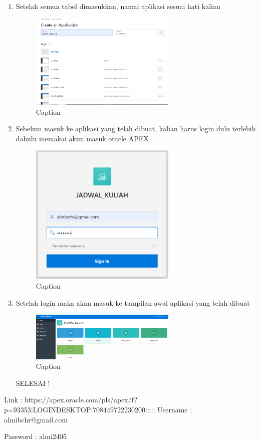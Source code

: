 \documentclass{article}
\begin{document}
\begin{enumerate}
    \item Setelah semua tabel dimasukkan, namai aplikasi sesuai hati kalian
     \begin{figure}[!htbp]
        \centering
        \includegraphics [width=7cm]{figure/Capture23.PNG}
        \caption{Caption}
        \label{fig:my_label}
    \end{figure}
    
    \item Sebelum masuk ke aplikasi yang telah dibuat, kalian harus login dulu terlebih dahulu memakai akun masuk oracle APEX
     \begin{figure}[!htbp]
        \centering
        \includegraphics [width=7cm]{figure/Capture24.PNG}
        \caption{Caption}
        \label{fig:my_label}
    \end{figure}
    
    \item Setelah login maka akan masuk ke tampilan awal aplikasi yang telah dibuat
     \begin{figure}[!htbp]
        \centering
        \includegraphics [width=7cm]{figure/Capture25.PNG}
        \caption{Caption}
        \label{fig:my_label}
    \end{figure}
    SELESAI !
\end{enumerate}
Link :  https://apex.oracle.com/pls/apex/f?p=93353:LOGIN\textunderscore DESKTOP:708449722230200:::::
Username : almibchr@gmail.com
\par
Password : almi2405
\end{document}
